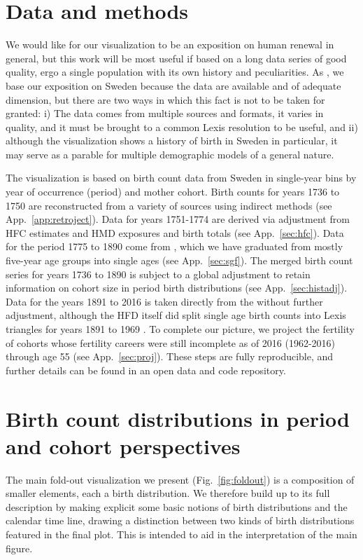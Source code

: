 \documentclass{article}
\begin{document}
\section{Data and methods}
\label{sec:data}
We would like for our visualization to be an exposition on human renewal in general, but this work will be most useful if based on a long data series of good quality, ergo a single population with its own history and peculiarities. As \citet{perozzo1880della}, we base our exposition on Sweden because the data are available and of adequate dimension, but there are two ways in which this fact is not to be taken for granted: i) The data comes from multiple sources and formats, it varies in quality, and it must be brought to a common Lexis resolution to be useful, and ii) although the visualization shows a history of birth in Sweden in particular, it may serve as a parable for multiple demographic models of a general nature. 

The visualization is based on birth count data from Sweden in single-year bins by year of occurrence (period) and mother cohort. Birth counts for years 1736 to 1750 are reconstructed from a variety of sources \citep{HFC, HMD, sweden1969historisk} using indirect methods (see App.~\ref{app:retroject}). Data for years 1751-1774 are derived via adjustment from HFC estimates and HMD exposures and birth totals (see App.~\ref{sec:hfc}). Data for the period 1775 to 1890 come from \citet{sgf1907}, which we have graduated from mostly five-year age groups into single ages (see App.~\ref{sec:sgf}). The merged birth count series for years 1736 to 1890 is subject to a global adjustment to retain information on cohort size in period birth distributions (see App.~\ref{sec:histadj}). Data for the years 1891 to 2016 is taken directly from the \citet{HFD} without further adjustment, although the HFD itself did split single age birth counts into Lexis triangles for years 1891 to 1969 \citep{persson2010human}. To complete our picture, we project the fertility of cohorts whose fertility careers were still incomplete as of 2016 (1962-2016) through age 55 (see App.~\ref{sec:proj}). These steps are fully reproducible, and further details can be found in an open data and code repository.

\section{Birth count distributions in period and cohort perspectives}
\label{sec:birthdist}

The main fold-out visualization we present (Fig.~\ref{fig:foldout}) is a composition of smaller elements, each a birth distribution. We therefore build up to its full description by making explicit some basic notions of birth distributions and the calendar time line, drawing a distinction between two kinds of birth distributions featured in the final plot. This is intended to aid in the interpretation of the main figure. 
\end{document}
